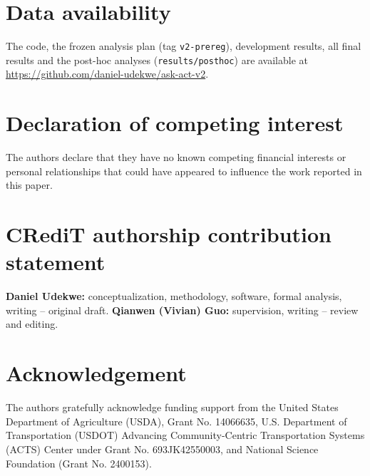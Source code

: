 \documentclass[a4paper,fleqn]{cas-dc}
\begin{document}
\section*{Data availability}
The code, the frozen analysis plan (tag \texttt{v2-prereg}), development results, all final results and the post-hoc analyses (\texttt{results/posthoc}) are available at \url{https://github.com/daniel-udekwe/ask-act-v2}.

\section*{Declaration of competing interest}
The authors declare that they have no known competing financial interests or personal relationships that could have appeared to influence the work reported in this paper.

\section*{CRediT authorship contribution statement}
\noindent\textbf{Daniel Udekwe:}  conceptualization, methodology, software, formal analysis, writing -- original draft. \textbf{Qianwen (Vivian) Guo:} supervision, writing -- review and editing.

\section*{Acknowledgement} 
The authors gratefully acknowledge funding support from the United States Department of Agriculture (USDA), Grant No. 14066635, U.S. Department of Transportation (USDOT) Advancing Community-Centric Transportation Systems (ACTS) Center under Grant No. 693JK42550003, and National Science Foundation (Grant No. 2400153).




\end{document}
